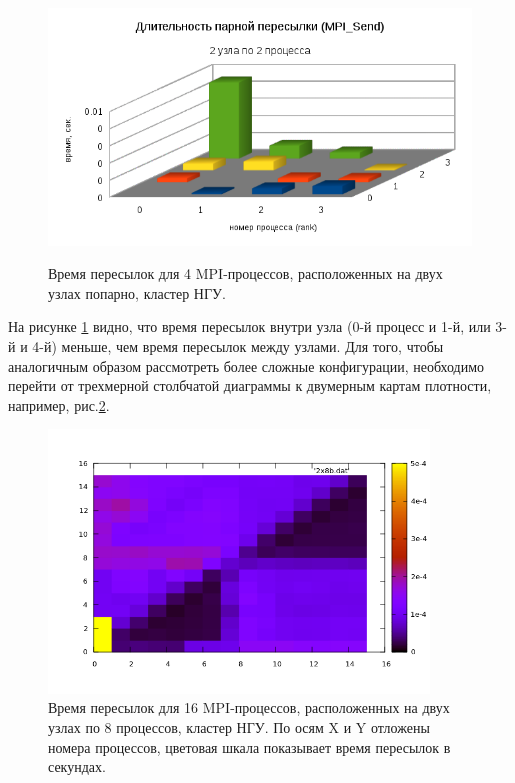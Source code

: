         \begin{figure}[htb]
        	\begin{center}
        		\includegraphics[height=7cm,keepaspectratio]{images/RomanenkoAASnytnikovAVChernykhIGadaptationtosupercomputerfinalEXTENDEDREFERENCES-img8.png}
        	\end{center}
        	\caption{ Время пересылок для 4 MPI-процессов, расположенных на двух узлах попарно, кластер НГУ.}
        	\label{2nodeNSU}
        \end{figure}
        
        
        На рисунке \ref{2nodeNSU} видно, что время пересылок внутри узла (0-й процесс и 1-й, или 3-й и 4-й) меньше, чем время пересылок между узлами. Для того, чтобы аналогичным образом рассмотреть более сложные конфигурации, необходимо перейти от трехмерной столбчатой диаграммы к двумерным картам плотности, например, рис.\ref{NSU16}. 
        
        \begin{figure}[htb]
        	\begin{center}
        		\includegraphics[height=7cm,keepaspectratio]{images/RomanenkoAASnytnikovAVChernykhIGadaptationtosupercomputerfinalEXTENDEDREFERENCES-img9.png}
        	\end{center}
        	\caption{ Время пересылок для 16 MPI-процессов, расположенных на двух узлах по 8 процессов, кластер НГУ. По осям X и Y отложены номера процессов, цветовая шкала показывает время пересылок в секундах.}
        	\label{NSU16}
        \end{figure}
        
